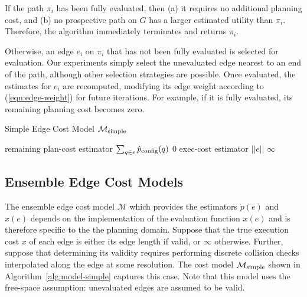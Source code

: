 If the path $\pi_i$ has been fully evaluated,
then (a) it requires no additional planning cost,
and (b) no prospective path on $G$ has a larger estimated utility
than $\pi_i$.
Therefore, the algorithm immediately terminates and returns $\pi_i$.

Otherwise,
an edge $e_i$ on $\pi_i$ that has not been fully evaluated
is selected for evaluation.
Our experiments simply select the unevaluated edge
nearest to an end of the path,
although other selection strategies are possible.
Once evaluated,
the estimates for $e_i$ are recomputed,
modifying its edge weight according to (\ref{eqn:edge-weight})
for future iterations.
For example, if it is fully evaluated,
its remaining planning cost becomes zero.

\begin{algorithm}[t]
\caption{Simple Edge Cost Model $\mathcal{M}_{\mbox{\scriptsize simple}}$}
\label{alg:model-simple}
\begin{algorithmic}[1]
   \Comment remaining plan-cost estimator
      \State \Return $\sum_{q \in e} \grave{p}_{\mbox{\scriptsize config}}(q)$
   \Else
      \State \Return $0$
   \EndIf
\EndFunction
{}
   \Comment exec-cost estimator
      \State \Return $||e||$
   \Else
      \State \Return $\infty$
   \EndIf
\EndFunction
\end{algorithmic}
\end{algorithm}

\subsection{Ensemble Edge Cost Models}
\label{subsec:lemur:ensemble-edge-cost-models}

The ensemble edge cost model $\mathcal{M}$
which provides the estimators $\grave{p}(e)$ and $\hat{x}(e)$
depends on the implementation of the evaluation function $x(e)$
and is therefore specific to the the planning domain.
Suppose that the true execution cost $x$ of each edge
is either its edge length if valid, or $\infty$ otherwise.
Further,
suppose that determining its validity requires performing
discrete collision checks interpolated along the edge at some
resolution.
The cost model $\mathcal{M}_{\mbox{\scriptsize simple}}$ shown in
Algorithm~\ref{alg:model-simple}
captures this case.
Note that this model uses the free-space assumption:
unevaluated edges are assumed to be valid.

